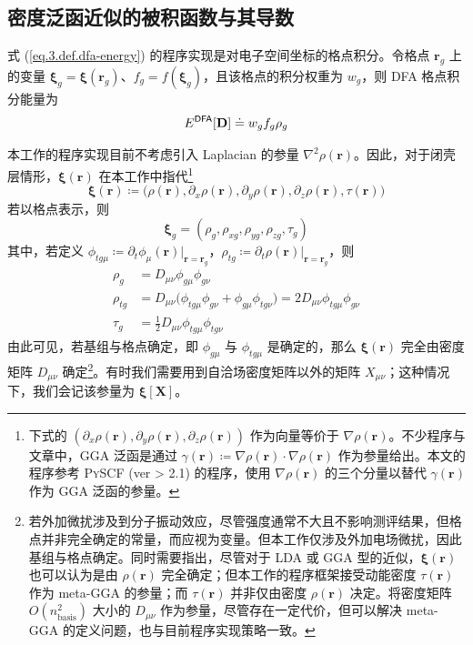\subsection{密度泛函近似的被积函数与其导数}
\label{sec.3.dft-grid}

式 (\ref{eq.3.def.dfa-energy}) 的程序实现是对电子空间坐标的格点积分。令格点 $\bm{r}_g$ 上的变量 $\bm{\xi}_g = \bm{\xi} (\bm{r}_g)$、$f_g = f(\bm{\xi}_g)$，且该格点的积分权重为 $w_g$，则 DFA 格点积分能量为
\begin{equation}
    E^{\textsf{DFA}} [\mathbf{D}] \doteq w_g f_g \rho_g
\end{equation}

本工作的程序实现目前不考虑引入 Laplacian 的参量 $\nabla^2 \rho (\bm{r})$。因此，对于闭壳层情形，$\bm{\xi} (\bm{r})$ 在本工作中指代\footnote{下式的 $(\partial_x \rho(\bm{r}), \partial_y \rho(\bm{r}), \partial_z \rho(\bm{r}))$ 作为向量等价于 $\nabla \rho(\bm{r})$。不少程序与文章中，GGA 泛函是通过 $\gamma(\bm{r}) \coloneq \nabla \rho(\bm{r}) \cdot \nabla \rho(\bm{r})$ 作为参量给出。本文的程序参考 \textsc{PySCF} (ver > 2.1) 的程序，使用 $\nabla \rho(\bm{r})$ 的三个分量以替代 $\gamma(\bm{r})$ 作为 GGA 泛函的参量。}
\begin{equation}
    \bm{\xi} (\bm{r}) \coloneq \big( \rho(\bm{r}), \partial_x \rho(\bm{r}), \partial_y \rho(\bm{r}), \partial_z \rho(\bm{r}), \tau(\bm{r}) \big)
\end{equation}
若以格点表示，则
\begin{equation}
    \label{eq.3.def.xi}
    \bm{\xi}_g = (\rho_g, \rho_{xg}, \rho_{yg}, \rho_{zg}, \tau_g)
\end{equation}
其中，若定义 $\phi_{tg\mu} \coloneq \partial_t \phi_\mu (\bm{r})|_{\bm{r} = \bm{r}_g}$，$\rho_{tg} \coloneq \partial_t \rho (\bm{r})|_{\bm{r} = \bm{r}_g}$，则
\begin{subequations}
\begin{align}
    \label{eq.3.def.rho-grid}
    \rho_g &= D_{\mu \nu} \phi_{g \mu} \phi_{g \nu} \\
    \label{eq.3.def.rho-t-grid}
    \rho_{tg} &= D_{\mu \nu} \big( \phi_{t g \mu} \phi_{g \nu} + \phi_{g \mu} \phi_{t g \nu} \big) = 2 D_{\mu \nu} \phi_{t g \mu} \phi_{g \nu} \\
    \label{eq.3.def.tau-grid}
    \tau_g &= \frac{1}{2} D_{\mu \nu} \phi_{t g \mu} \phi_{t g \nu}
\end{align}
\end{subequations}
由此可见，若基组与格点确定，即 $\phi_{g\mu}$ 与 $\phi_{tg\mu}$ 是确定的，那么 $\bm{\xi} (\bm{r})$ 完全由密度矩阵 $D_{\mu \nu}$ 确定\footnote{若外加微扰涉及到分子振动效应，尽管强度通常不大且不影响测评结果，但格点并非完全确定的常量，而应视为变量。但本工作仅涉及外加电场微扰，因此基组与格点确定。同时需要指出，尽管对于 LDA 或 GGA 型的近似，$\bm{\xi} (\bm{r})$ 也可以认为是由 $\rho(\bm{r})$ 完全确定；但本工作的程序框架接受动能密度 $\tau (\bm{r})$ 作为 meta-GGA 的参量；而 $\tau (\bm{r})$ 并非仅由密度 $\rho(\bm{r})$ 决定。将密度矩阵 $O(n_\mathrm{basis}^2)$ 大小的 $D_{\mu \nu}$ 作为参量，尽管存在一定代价，但可以解决 meta-GGA 的定义问题，也与目前程序实现策略一致。}。有时我们需要用到自洽场密度矩阵以外的矩阵 $X_{\mu \nu}$；这种情况下，我们会记该参量为 $\bm{\xi}[\mathbf{X}]$。

